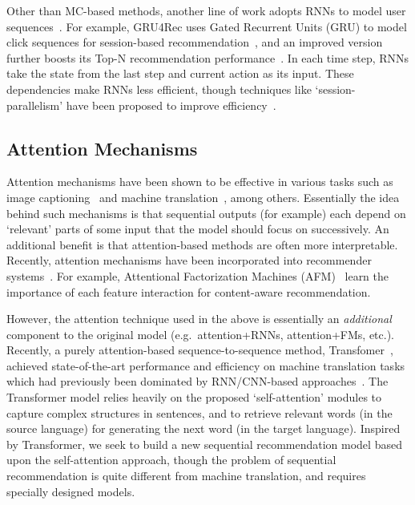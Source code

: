 \documentclass[conference]{IEEEtran}
\begin{document}
Other than MC-based methods, another line of work 
adopts RNNs to model user sequences~\cite{DBLP:conf/wsdm/JingS17,DBLP:journals/corr/HidasiKBT15,DBLP:conf/icdm/LiuWWLW16,DBLP:conf/wsdm/BeutelCJXLGC18}. For example, GRU4Rec uses Gated Recurrent Units (GRU) to model click sequences for session-based recommendation~\cite{DBLP:journals/corr/HidasiKBT15}, and an improved version further boosts its Top-N recommendation performance~\cite{DBLP:journals/corr/HidasiK17}. In each time step, RNNs take the state from the last step and current action as its input. 
These dependencies
make RNNs less efficient,
though techniques like `session-parallelism' 
have been
proposed to improve efficiency~\cite{DBLP:journals/corr/HidasiKBT15}.

\subsection{Attention Mechanisms}

Attention mechanisms
have
been shown 
to be
effective in various tasks such as image captioning~\cite{DBLP:conf/icml/XuBKCCSZB15} and
machine translation~\cite{DBLP:journals/corr/BahdanauCB14}, among others. 
Essentially the idea behind such mechanisms is that sequential outputs (for example) each depend on `relevant' parts of some input that the model should focus on successively.
An additional benefit is that attention-based methods are 
often
more interpretable. Recently, 
attention mechanisms have been
incorporated into
recommender systems~\cite{DBLP:conf/sigir/ChenZ0NLC17, DBLP:conf/ijcai/XiaoY0ZWC17, DBLP:conf/aaai/WangHCHL018}. For example,
Attentional Factorization Machines (AFM)~\cite{DBLP:conf/ijcai/XiaoY0ZWC17} learn the importance of each feature interaction for content-aware recommendation. 



However, the attention technique used in the above is essentially an \emph{additional} component to the
original
model (e.g.~attention+RNNs, attention+FMs, etc.). Recently, a purely attention-based sequence-to-sequence method, Transfomer~\cite{transform}, achieved state-of-the-art performance and efficiency on machine translation tasks which 
had previously been
dominated by RNN/CNN-based approaches~\cite{wu2016google,DBLP:journals/tacl/ZhouCWLX16}. The Transformer model 
relies
heavily 
on
the proposed `self-attention' modules to capture complex structures 
in
sentences, and to retrieve relevant words (in the source language) for generating the next word (in the target language). Inspired by Transformer, we seek to build a new sequential recommendation model based upon the self-attention approach, 
though the problem of sequential recommendation is quite different from machine translation, 
and 
requires specially designed models. 
\end{document}
